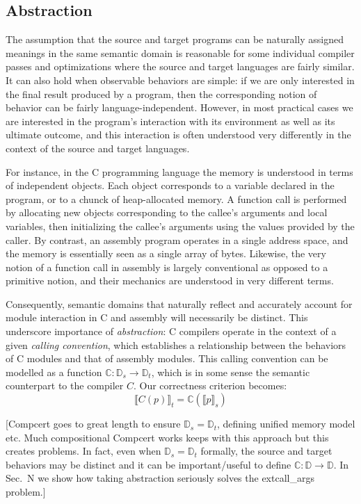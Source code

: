 \documentclass[sigplan,10pt,review,anonymous]{acmart}
\begin{document}

\subsection{Abstraction} %

The assumption that the source and target programs
can be naturally assigned meanings in the same semantic domain
is reasonable for some individual compiler passes and optimizations
where the source and target languages are fairly similar.
It can also hold when observable behaviors are simple:
if we are only interested in the final result produced by a program,
then the corresponding notion of behavior
can be fairly language-independent.
However,
in most practical cases we are interested in
the program's interaction with its environment
as well as its ultimate outcome,
and this interaction is often understood very differently
in the context of the source and target languages.

For instance,
in the C programming language
the memory is understood in terms of independent objects.
Each object corresponds to a variable declared in the program,
or to a chunck of heap-allocated memory.
A function call is performed by allocating new objects
corresponding to the callee's arguments and local variables,
then initializing the callee's arguments
using the values provided by the caller.
By contrast,
an assembly program
operates in a single address space,
and the memory is essentially seen as a single array of bytes.
Likewise,
the very notion of a function call in assembly
is largely conventional as opposed to a primitive notion,
and their mechanics are understood in very different terms.

Consequently,
semantic domains that naturally reflect and accurately account
for module interaction in C and assembly will necessarily be distinct.
This underscore importance of \emph{abstraction}:
C compilers operate in the context of a given \emph{calling convention},
which establishes a relationship between the behaviors of C modules
and that of assembly modules.
This calling convention can be modelled as a function
$\mathbb{C} : \mathbb{D}_s \rightarrow \mathbb{D}_t$,
which is in some sense the semantic counterpart to the compiler $C$.
Our correctness criterion becomes:
\[ \llbracket C(p) \rrbracket_t =
    \mathbb{C}(\llbracket p \rrbracket_s) \]

[Compcert goes to great length to ensure $\mathbb{D}_s = \mathbb{D}_t$,
defining unified memory model etc.
Much compositional Compcert works keeps with this approach
but this creates problems.
In fact, even when $\mathbb{D}_s = \mathbb{D}_t$ formally,
the source and target behaviors may be distinct
and it can be important/useful to define
$\mathbb{C} : \mathbb{D} \rightarrow \mathbb{D}$.
In Sec.~N we show how taking abstraction seriously
solves the extcall\_args problem.]
\end{document}
